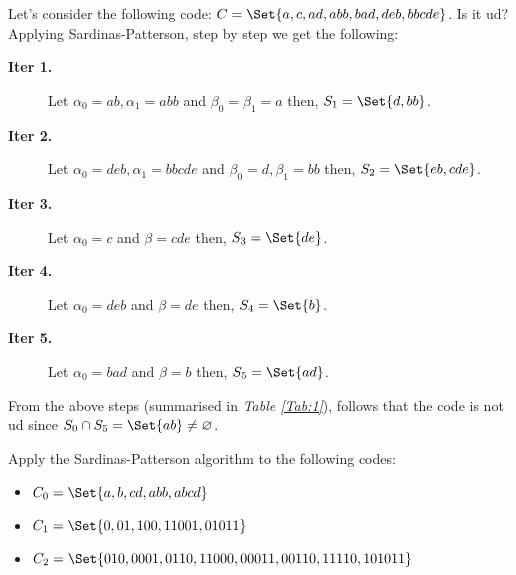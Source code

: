 \documentclass{subfiles}
\begin{document}
    \begin{example*}
        Let's consider the following code: \(C = \Set{a, c, ad, abb, bad, deb,bbcde}\).
        Is it \gls{ud}? Applying Sardinas-Patterson, step by step we get the following:
        \begin{description}
            \item [\textbf{Iter 1. }] Let \(\alpha_{0} = ab, \alpha_{1} = abb\) 
                and \(\beta_{0} = \beta_{1} = a\) then, \(S_{1} = \Set{d, bb}\).
            \item [\textbf{Iter 2. }] Let \(\alpha_{0} = deb, \alpha_{1} = bbcde\)
                and \(\beta_{0} = d, \beta_{1} = bb\) then, \(S_{2} = \Set{eb, cde}\).
            \item [\textbf{Iter 3. }] Let \(\alpha_{0} = c\) and \(\beta = cde\)
                then, \(S_{3} = \Set{de}\). 
            \item [\textbf{Iter 4. }] Let \(\alpha_{0} = deb\) and \(\beta = de\)
                then, \(S_{4} = \Set{b}\). 
            \item [\textbf{Iter 5. }] Let \(\alpha_{0} = bad\) and \(\beta = b\)
                then, \(S_{5} = \Set{ad}\). 
        \end{description}
        From the above steps (summarised in \emph{Table \ref{Tab:1}}), 
            follows that the code is not \gls{ud} since \(S_{0} \cap S_{5} =
            \Set{ab} \ne \varnothing\).
            
    \end{example*}
    \begin{exercise}
        Apply the Sardinas-Patterson algorithm to the following codes:
        \begin{itemize}
            \item \(C_{0} = \Set{a, b, cd, abb, abcd }\) 
            \item \(C_{1} = \Set{0, 01, 100, 11001, 01011}\)
            \item \(C_{2} = \Set{010, 0001, 0110, 11000, 00011, 00110, 11110, 101011}\)
        \end{itemize}
    \end{exercise}
\end{document}
